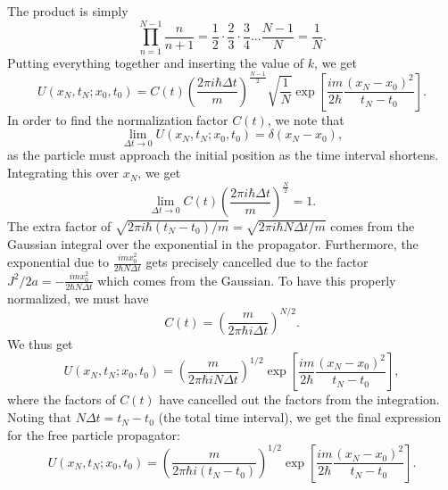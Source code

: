 The product is simply
\begin{equation}
    \prod_{n=1}^{N-1}\frac n {n+1}=\frac 1 2 \cdot  \frac 2 3 \cdot \frac 3 4... \frac {N-1} N= \frac 1 N.
\end{equation}
Putting everything together and inserting the value of $k$, we get
\begin{equation}
    U(x_N,t_N;x_0,t_0)=C(t)\left(\frac{2\pi i \hbar \Delta t} m \right )^{\frac{N-1} 2}\sqrt{\frac 1 N} \exp[\frac{im}{2\hbar}\frac{(x_N-x_0)^2}{t_N-t_0}].
\end{equation}
In order to find the normalization factor $C(t)$, we note that
\begin{equation}
    \lim_{\Delta t\to 0} U(x_N,t_N;x_0,t_0)=\delta(x_N-x_0),
\end{equation}
as the particle must approach the initial position as the time interval shortens. Integrating this over $x_N$, we get
\begin{equation}
    \lim_{\Delta t \to 0} C(t)\left(\frac{2\pi i \hbar \Delta t} m \right )^{\frac{N} 2} =1.
\end{equation}
The extra factor of $\sqrt{2\pi i \hbar (t_N-t_0)/m}=\sqrt{2\pi i \hbar N\Delta t/m}$ comes from the Gaussian integral over the exponential in the propagator. Furthermore, the exponential due to $\frac{imx_0^2}{2\hbar N\Delta t}$ gets precisely cancelled due to the factor $J^2/2a=-\frac{imx_0^2}{2\hbar N\Delta t}$ which comes from the Gaussian. To have this properly normalized, we must have
\begin{equation}
    C(t)=\left( \frac m {2\pi\hbar i \Delta t }\right ) ^{N/2}.
\end{equation}
We thus get 
\begin{equation}
    U(x_N,t_N;x_0,t_0)=\left( \frac m {2\pi\hbar i N\Delta t}\right ) ^{1/2}\exp[\frac{im}{2\hbar}\frac{(x_N-x_0)^2}{t_N-t_0}],
\end{equation}
where the factors of $C(t)$ have cancelled out the factors from the integration. Noting that $N\Delta t=t_N-t_0$ (the total time interval), we get the final expression for the free particle propagator:
\begin{equation}
    U(x_N,t_N;x_0,t_0)=\left( \frac m {2\pi\hbar i (t_N-t_0)}\right ) ^{1/2}\exp[\frac{im}{2\hbar}\frac{(x_N-x_0)^2}{t_N-t_0}].
\end{equation}